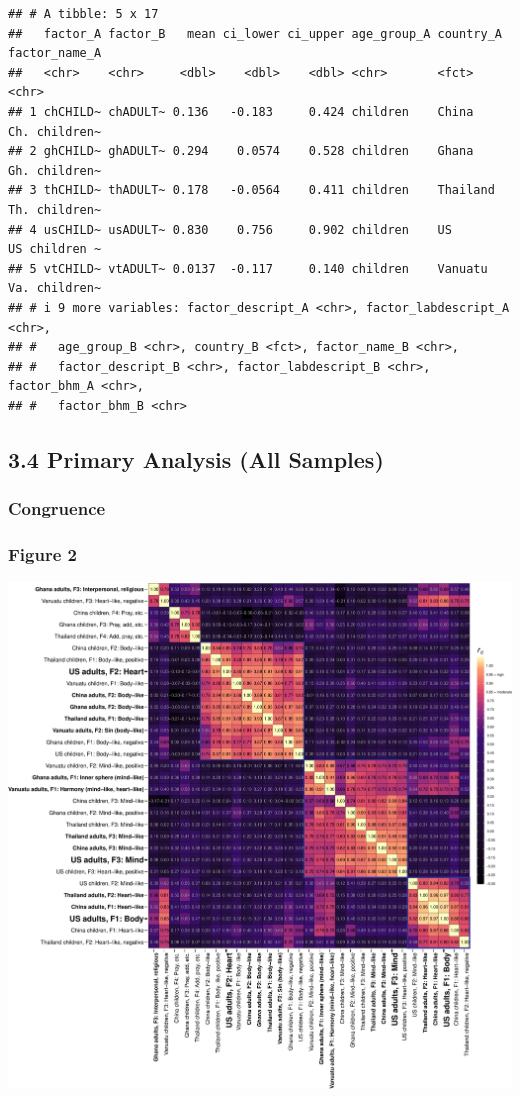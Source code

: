 \documentclass[
  man]{apa6}
\begin{document}
\begin{verbatim}
## # A tibble: 5 x 17
##   factor_A factor_B   mean ci_lower ci_upper age_group_A country_A factor_name_A
##   <chr>    <chr>     <dbl>    <dbl>    <dbl> <chr>       <fct>     <chr>        
## 1 chCHILD~ chADULT~ 0.136   -0.183     0.424 children    China     Ch. children~
## 2 ghCHILD~ ghADULT~ 0.294    0.0574    0.528 children    Ghana     Gh. children~
## 3 thCHILD~ thADULT~ 0.178   -0.0564    0.411 children    Thailand  Th. children~
## 4 usCHILD~ usADULT~ 0.830    0.756     0.902 children    US        US children ~
## 5 vtCHILD~ vtADULT~ 0.0137  -0.117     0.140 children    Vanuatu   Va. children~
## # i 9 more variables: factor_descript_A <chr>, factor_labdescript_A <chr>,
## #   age_group_B <chr>, country_B <fct>, factor_name_B <chr>,
## #   factor_descript_B <chr>, factor_labdescript_B <chr>, factor_bhm_A <chr>,
## #   factor_bhm_B <chr>
\end{verbatim}

\hypertarget{primary-analysis-all-samples}{%
\subsection{3.4 Primary Analysis (All Samples)}\label{primary-analysis-all-samples}}

\hypertarget{congruence-1}{%
\subsubsection{Congruence}\label{congruence-1}}

\hypertarget{figure-2}{%
\subsubsection{Figure 2}\label{figure-2}}

\includegraphics{Script_Re_Weisman_2021_Group1_2024_files/figure-latex/cong all pairs plot a-1.pdf}
\end{document}
